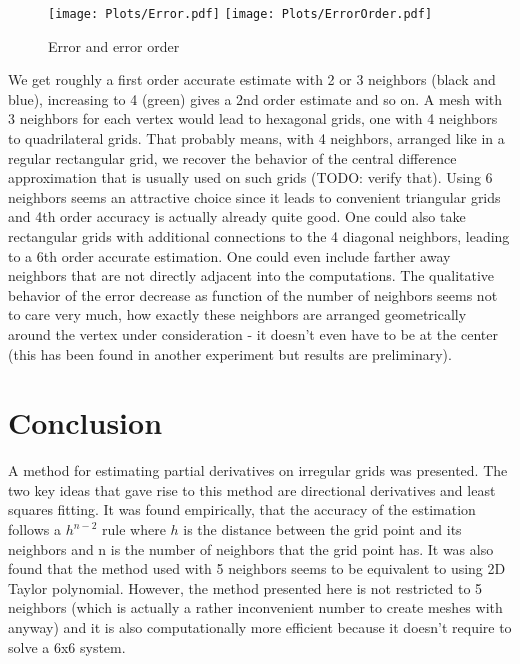 \begin{figure}[h]
	\centering
  	\texttt{[image: Plots/Error.pdf]}
  	\texttt{[image: Plots/ErrorOrder.pdf]}
	\caption{Error and error order}
	\label{fig:Error}
\end{figure}
We get roughly a first order accurate estimate with 2 or 3 neighbors (black and blue), increasing to 4 (green) gives a 2nd order estimate and so on. A mesh with 3 neighbors for each vertex would lead to hexagonal grids, one with 4 neighbors to quadrilateral grids. That probably means, with 4 neighbors, arranged like in a regular rectangular grid, we recover the behavior of the central difference approximation that is usually used on such grids (TODO: verify that). Using 6 neighbors seems an attractive choice since it leads to convenient triangular grids and 4th order accuracy is actually already quite good. One could also take rectangular grids with additional connections to the 4 diagonal neighbors, leading to a 6th order accurate estimation. One could even include farther away neighbors that are not directly adjacent into the computations. The qualitative behavior of the error decrease as function of the number of neighbors seems not to care very much, how exactly these neighbors are arranged geometrically around the vertex under consideration - it doesn't even have to be at the center (this has been found in another experiment but results are preliminary).

\section{Conclusion}
A method for estimating partial derivatives on irregular grids was presented. The two key ideas that gave rise to this method are directional derivatives and least squares fitting. It was found empirically, that the accuracy of the estimation follows a $h^{n-2}$ rule where $h$ is the distance between the grid point and its neighbors and n is the number of neighbors that the grid point has. It was also found that the method used with 5 neighbors seems to be equivalent to using 2D Taylor polynomial. However, the method presented here is not restricted to 5 neighbors (which is actually a rather inconvenient number to create meshes with anyway) and it is also computationally more efficient because it doesn't require to solve a 6x6 system.


